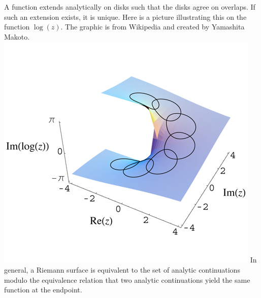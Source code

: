 \documentclass[11pt,leqno,oneside]{amsart}
\begin{document}
  A function extends analytically on disks such that the disks agree
  on overlaps. If such an extension exists, it is unique. Here is a
  picture illustrating this on the function $\log(z)$. The graphic is
  from Wikipedia and created by Yamashita Makoto. \\
  \includegraphics{images/Imaginary_log_analytic_continuation.png}
  In general, a Riemann surface is equivalent to the set of analytic
  continuations modulo the equivalence relation that two analytic
  continuations yield the same function at the endpoint.
\end{document}
